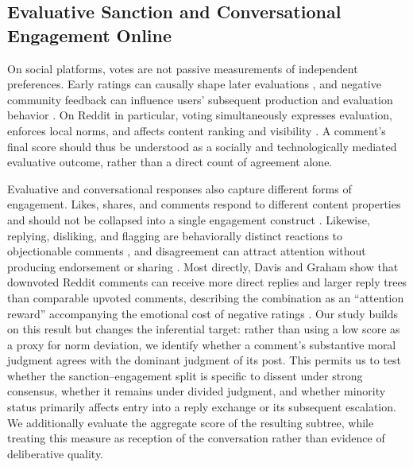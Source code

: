 \subsection{Evaluative Sanction and Conversational Engagement Online}

On social platforms, votes are not passive measurements of independent preferences. Early ratings can causally shape later evaluations \cite{muchnik2013social,glenski2017rating}, and negative community feedback can influence users' subsequent production and evaluation behavior \cite{cheng2014community}. On Reddit in particular, voting simultaneously expresses evaluation, enforces local norms, and affects content ranking and visibility \cite{graham2021sociomateriality}. A comment's final score should thus be understood as a socially and technologically mediated evaluative outcome, rather than a direct count of agreement alone.

Evaluative and conversational responses also capture different forms of engagement. Likes, shares, and comments respond to different content properties and should not be collapsed into a single engagement construct \cite{tenenboim2022comments}. Likewise, replying, disliking, and flagging are behaviorally distinct reactions to objectionable comments \cite{kalch2017replying}, and disagreement can attract attention without producing endorsement or sharing \cite{dutceac2022cueing}. Most directly, Davis and Graham show that downvoted Reddit comments can receive more direct replies and larger reply trees than comparable upvoted comments, describing the combination as an ``attention reward'' accompanying the emotional cost of negative ratings \cite{davis2021emotional}. Our study builds on this result but changes the inferential target: rather than using a low score as a proxy for norm deviation, we identify whether a comment's substantive moral judgment agrees with the dominant judgment of its post. This permits us to test whether the sanction--engagement split is specific to dissent under strong consensus, whether it remains under divided judgment, and whether minority status primarily affects entry into a reply exchange or its subsequent escalation. We additionally evaluate the aggregate score of the resulting subtree, while treating this measure as reception of the conversation rather than evidence of deliberative quality.

